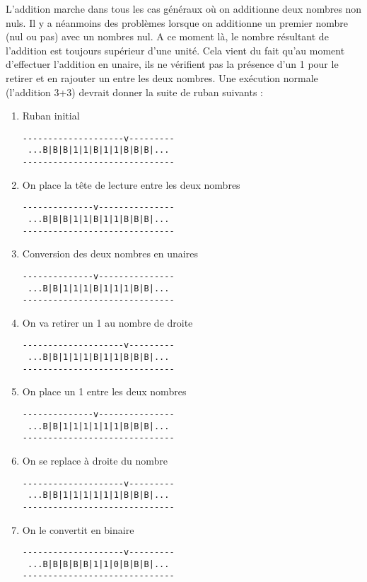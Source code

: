 \documentclass[a4paper,11pt]{article}
\begin{document}
L'addition marche dans tous les cas généraux où on additionne deux nombres non nuls. Il y a néanmoins des problèmes lorsque on additionne un premier nombre (nul ou pas) avec un nombres nul. A ce moment là, le nombre résultant de l'addition est toujours supérieur d'une unité. Cela vient du fait qu'au moment d'effectuer l'addition en unaire, ils ne vérifient pas la présence d'un 1 pour le retirer et en rajouter un entre les deux nombres.
Une exécution normale (l'addition 3+3) devrait donner la suite de ruban suivants :
\begin{enumerate}
\item Ruban initial
\begin{verbatim}
--------------------v---------
 ...B|B|B|1|1|B|1|1|B|B|B|...
------------------------------
\end{verbatim}
\item On place la tête de lecture entre les deux nombres
\begin{verbatim}
--------------v---------------
 ...B|B|B|1|1|B|1|1|B|B|B|...
------------------------------
\end{verbatim}
\item Conversion des deux nombres en unaires
\begin{verbatim}
--------------v---------------
 ...B|B|1|1|1|B|1|1|1|B|B|...
------------------------------
\end{verbatim}
\item On va retirer un 1 au nombre de droite
\begin{verbatim}
--------------------v---------
 ...B|B|1|1|1|B|1|1|B|B|B|...
------------------------------
\end{verbatim}
\item On place un 1 entre les deux nombres
\begin{verbatim}
--------------v---------------
 ...B|B|1|1|1|1|1|1|B|B|B|...
------------------------------
\end{verbatim}
\item On se replace à droite du nombre
\begin{verbatim}
--------------------v---------
 ...B|B|1|1|1|1|1|1|B|B|B|...
------------------------------
\end{verbatim}
\item On le convertit en binaire
\begin{verbatim}
--------------------v---------
 ...B|B|B|B|B|1|1|0|B|B|B|...
------------------------------
\end{verbatim}
\end{enumerate}
\end{document}
